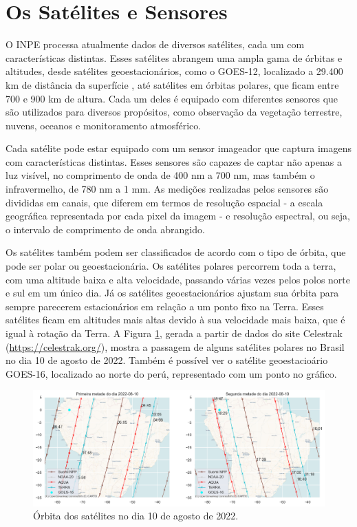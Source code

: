 \documentclass[cic,tc]{iiufrgs}
\begin{document}
\section{Os Satélites e Sensores}

O INPE processa atualmente dados de diversos satélites, cada um com características distintas. Esses satélites abrangem uma ampla gama de órbitas e altitudes, desde satélites geoestacionários, como o GOES-12, localizado a 29.400 km de distância da superfície \citep{GOES12Algo}, até satélites em órbitas polares, que ficam entre 700 e 900 km de altura. Cada um deles é equipado com diferentes sensores que são utilizados para diversos propósitos, como observação da vegetação terrestre, nuvens, oceanos e monitoramento atmosférico. \par

Cada satélite pode estar equipado com um sensor imageador que captura imagens com características distintas. Esses sensores são capazes de captar não apenas a luz visível, no comprimento de onda de 400 nm a 700 nm, mas também o infravermelho, de 780 nm a 1 mm. As medições realizadas pelos sensores são divididas em canais, que diferem em termos de resolução espacial - a escala geográfica representada por cada pixel da imagem - e resolução espectral, ou seja, o intervalo de comprimento de onda abrangido. \par

Os satélites também podem ser classificados de acordo com o tipo de órbita, que pode ser polar ou geoestacionária. Os satélites polares percorrem toda a terra, com uma altitude baixa e alta velocidade, passando várias vezes pelos polos norte e sul em um único dia. Já os satélites geoestacionários ajustam sua órbita para sempre parecerem estacionários em relação a um ponto fixo na Terra. Esses satélites ficam em altitudes mais altas devido à sua velocidade mais baixa, que é igual à rotação da Terra. A Figura \ref{fig:orbita2022-08-10}, gerada a partir de dados do site Celestrak (\url{https://celestrak.org/}), mostra a passagem de alguns satélites polares no Brasil no dia 10 de agosto de 2022. Também é possível ver o satélite geoestacioário GOES-16, localizado ao norte do perú, representado com um ponto no gráfico. \par

\begin{figure}[!htb]
    \caption{Órbita dos satélites no dia 10 de agosto de 2022.}
    \begin{center}
        \includegraphics[width=35em]{orbita2022-08-10}
    \end{center}
    \label{fig:orbita2022-08-10}
\end{figure}
\end{document}
